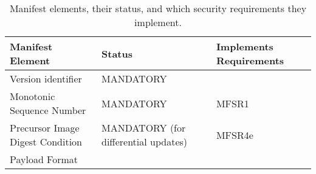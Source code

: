 \documentclass[0-thesis.tex]{subfiles}
\begin{document}
\begin{longtable}[]{@{}lll@{}}
    \caption{Manifest elements, their status, and which security requirements they implement.}
    \label{tab:elements-to-requirements}\\
    \toprule
    \begin{minipage}[b]{0.32\columnwidth}\raggedright\strut Manifest Element\strut
    \end{minipage} & \begin{minipage}[b]{0.36\columnwidth}\raggedright\strut Status\strut
    \end{minipage} & \begin{minipage}[b]{0.23\columnwidth}\raggedright\strut Implements
    Requirements\strut \end{minipage}\tabularnewline
    \midrule
    \endhead
    \begin{minipage}[t]{0.32\columnwidth}\raggedright\strut Version identifier\strut
    \end{minipage} & \begin{minipage}[t]{0.36\columnwidth}\raggedright\strut
    MANDATORY\strut \end{minipage} &
    \begin{minipage}[t]{0.23\columnwidth}\raggedright\strut
    \strut
    \end{minipage}\tabularnewline
    \begin{minipage}[t]{0.32\columnwidth}\raggedright\strut Monotonic Sequence
    Number\strut \end{minipage} & \begin{minipage}[t]{0.36\columnwidth}\raggedright\strut
    MANDATORY\strut \end{minipage} &
    \begin{minipage}[t]{0.23\columnwidth}\raggedright\strut MFSR1\strut
    \end{minipage}\tabularnewline
    \begin{minipage}[t]{0.32\columnwidth}\raggedright\strut Precursor Image Digest
    Condition\strut \end{minipage} &
    \begin{minipage}[t]{0.36\columnwidth}\raggedright\strut MANDATORY (for differential
    updates)\strut \end{minipage} &
    \begin{minipage}[t]{0.23\columnwidth}\raggedright\strut MFSR4e\strut
    \end{minipage}\tabularnewline
    \begin{minipage}[t]{0.32\columnwidth}\raggedright\strut Payload Format\strut

\end{minipage}
\end{longtable}
\end{document}
